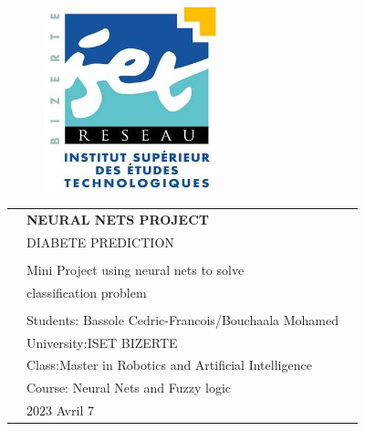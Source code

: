 \begin{center}

    \vspace*{1cm}
    
    \begin{figure}
      \raggedleft
      \begin{minipage}{4cm}
      \includegraphics[width=5cm]{images/logo-isetbz.png}
      \end{minipage}
    \end{figure}
    
    \vspace*{2cm}
    
    \vspace*{0.1in}
    
    \begin{spacing}{1.7}
    
    \begin{tabular}{p{4cm} ll}
    
    & \textbf{\huge NEURAL NETS PROJECT}\\ %
    & \Large DIABETE PREDICTION\\ %
    & \\
    & \large Mini Project using neural nets to solve \\
    & \large classification problem  \\ 
    
    & \\
    & \large Students: Bassole Cedric-Francois/Bouchaala Mohamed\\
    & \large University:ISET BIZERTE \\
    & \large Class:Master in Robotics and Artificial Intelligence \\
    & \large Course: Neural Nets and Fuzzy logic \\
    & \large 2023 Avril 7
    \end{tabular}
    
    \end{spacing}
    
    \end{center}
    
    
    
    \thispagestyle{empty} %
    \clearpage\setcounter{page}{1} %
